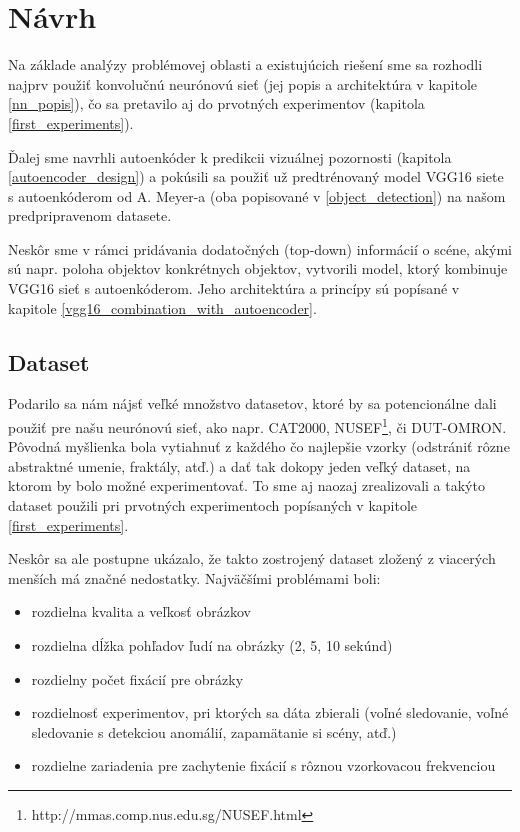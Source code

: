 
\newpage
\section{Návrh}
\label{design}

Na základe analýzy problémovej oblasti a existujúcich riešení sme sa rozhodli najprv použiť konvolučnú neurónovú sieť (jej popis a architektúra v kapitole \ref{nn_popis}), čo sa pretavilo aj do prvotných experimentov (kapitola \ref{first_experiments}).

Ďalej sme navrhli autoenkóder k predikcii vizuálnej pozornosti (kapitola \ref{autoencoder_design}) a pokúsili sa použiť už predtrénovaný model VGG16 siete s autoenkóderom od A. Meyer-a (oba popisované v \ref{object_detection}) na našom predpripravenom datasete. 

Neskôr sme v rámci pridávania dodatočných (top-down) informácií o scéne, akými sú napr. poloha objektov konkrétnych objektov, vytvorili model, ktorý kombinuje VGG16 sieť s autoenkóderom. Jeho architektúra a princípy sú popísané v kapitole \ref{vgg16_combination_with_autoencoder}.

\subsection{Dataset}
\label{dataset_description}
Podarilo sa nám nájsť veľké množstvo datasetov, ktoré by sa potencionálne dali použiť pre našu neurónovú sieť, ako napr. 
CAT2000\cite{borji2015cat2000}, NUSEF\footnote{http://mmas.comp.nus.edu.sg/NUSEF.html}, či DUT-OMRON\cite{dut-omron}. Pôvodná myšlienka bola vytiahnuť z každého čo najlepšie vzorky (odstrániť rôzne abstraktné umenie, fraktály, atď.) a dať tak dokopy jeden veľký dataset, na ktorom by bolo možné experimentovať. To sme aj naozaj zrealizovali a takýto dataset použili pri prvotných experimentoch popísaných v kapitole \ref{first_experiments}.

Neskôr sa ale postupne ukázalo, že takto zostrojený dataset zložený z viacerých menších má značné nedostatky. Najväčšími problémami boli:
\begin{itemize}
	\item rozdielna kvalita a veľkosť obrázkov
	\item rozdielna dĺžka pohľadov ľudí na obrázky (2, 5, 10 sekúnd)
	\item rozdielny počet fixácií pre obrázky
	\item rozdielnosť experimentov, pri ktorých sa dáta zbierali (voľné sledovanie, voľné sledovanie s detekciou anomálií, zapamätanie si scény, atď.)
	\item rozdielne zariadenia pre zachytenie fixácií s rôznou vzorkovacou frekvenciou 
\end{itemize}

